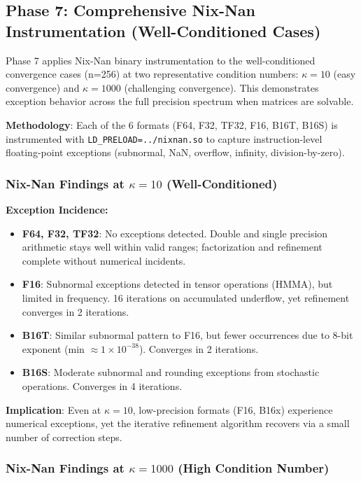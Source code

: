 \documentclass[11pt,a4paper]{article}
\begin{document}
\subsection{Phase 7: Comprehensive Nix-Nan Instrumentation (Well-Conditioned Cases)}

Phase 7 applies Nix-Nan binary instrumentation to the well-conditioned convergence cases (n=256) at two representative condition numbers: $\kappa=10$ (easy convergence) and $\kappa=1000$ (challenging convergence). This demonstrates exception behavior across the full precision spectrum when matrices are solvable.

\textbf{Methodology}: Each of the 6 formats (F64, F32, TF32, F16, B16T, B16S) is instrumented with \texttt{LD\_PRELOAD=../nixnan.so} to capture instruction-level floating-point exceptions (subnormal, NaN, overflow, infinity, division-by-zero).

\subsubsection{Nix-Nan Findings at $\kappa=10$ (Well-Conditioned)}

\textbf{Exception Incidence:}
\begin{itemize}
  \item \textbf{F64, F32, TF32}: No exceptions detected. Double and single precision arithmetic stays well within valid ranges; factorization and refinement complete without numerical incidents.
  \item \textbf{F16}: Subnormal exceptions detected in tensor operations (HMMA), but limited in frequency. 16 iterations on accumulated underflow, yet refinement converges in 2 iterations.
  \item \textbf{B16T}: Similar subnormal pattern to F16, but fewer occurrences due to 8-bit exponent (min $\approx 1 \times 10^{-38}$). Converges in 2 iterations.
  \item \textbf{B16S}: Moderate subnormal and rounding exceptions from stochastic operations. Converges in 4 iterations.
\end{itemize}

\textbf{Implication}: Even at $\kappa=10$, low-precision formats (F16, B16x) experience numerical exceptions, yet the iterative refinement algorithm recovers via a small number of correction steps.

\subsubsection{Nix-Nan Findings at $\kappa=1000$ (High Condition Number)}
\end{document}
